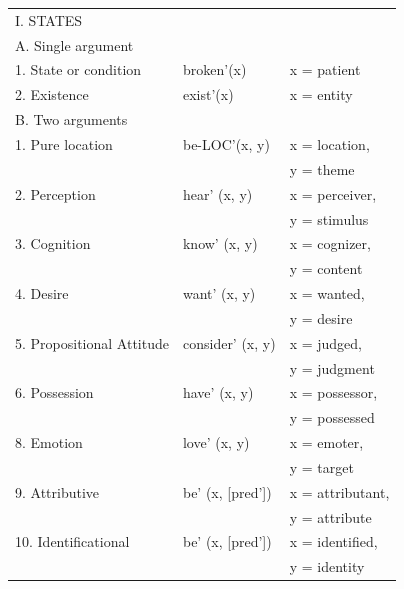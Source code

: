 \begin{table}[H]
\centering
\begin{tabular}{@{}lll@{}}
\hline
\multicolumn{3}{l}{I. STATES}                         \\
\hspace{2em}A. Single argument    &    &   \\
\hspace{4em}1. State or condition & broken'(x)    & x = patient   \\
\hspace{4em}2. Existence          & exist'(x)     & x = entity    \\
\multicolumn{3}{l}{\hspace{1.5em}B. Two arguments}                  \\
\hspace{4em}1. Pure location & be-LOC'(x, y) & x = location, \\ & & y = theme \\
  \hspace{4em}2. Perception   & hear' (x, y) & x = perceiver, \\ & &
y = stimulus            \\
    \hspace{4em}3. Cognition & know' (x, y) & x = cognizer,  \\ & &
y = content            \\
\hspace{4em}4. Desire & want' (x, y) & x = wanted, \\ & &
y = desire              \\
\hspace{4em}5. Propositional Attitude & consider' (x, y) & x = judged, \\& & y = judgment               \\
\hspace{4em}6. Possession & have' (x, y) & x = possessor, \\ & & y = possessed              \\
\hspace{4em}8. Emotion & love' (x, y) & x = emoter, \\ & & y = target \\
\hspace{4em}9. Attributive & be' (x, [pred']) & x = attributant, \\ & & y = attribute   \\
\hspace{4em}10. Identificational & be' (x, [pred']) & x = identified, \\ & & y = identity \\

\end{tabular}
\end{table}
